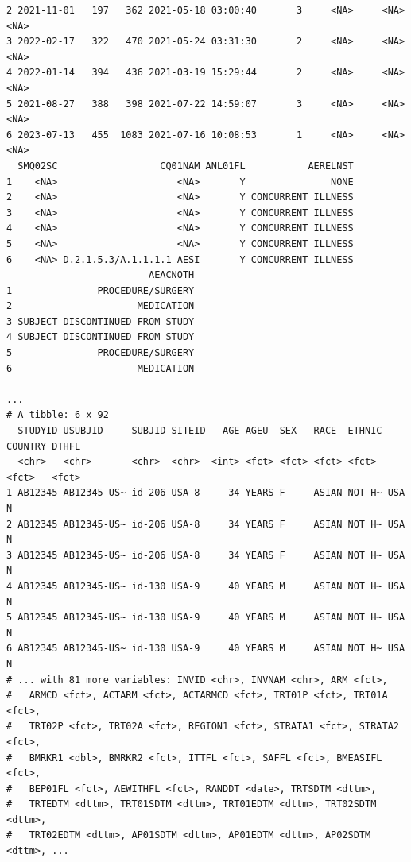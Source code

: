 \documentclass[
  letterpaper,
  DIV=11,
  numbers=noendperiod]{scrreprt}
\begin{document}
\begin{verbatim}
2 2021-11-01   197   362 2021-05-18 03:00:40       3     <NA>     <NA>    <NA>
3 2022-02-17   322   470 2021-05-24 03:31:30       2     <NA>     <NA>    <NA>
4 2022-01-14   394   436 2021-03-19 15:29:44       2     <NA>     <NA>    <NA>
5 2021-08-27   388   398 2021-07-22 14:59:07       3     <NA>     <NA>    <NA>
6 2023-07-13   455  1083 2021-07-16 10:08:53       1     <NA>     <NA>    <NA>
  SMQ02SC                  CQ01NAM ANL01FL           AERELNST
1    <NA>                     <NA>       Y               NONE
2    <NA>                     <NA>       Y CONCURRENT ILLNESS
3    <NA>                     <NA>       Y CONCURRENT ILLNESS
4    <NA>                     <NA>       Y CONCURRENT ILLNESS
5    <NA>                     <NA>       Y CONCURRENT ILLNESS
6    <NA> D.2.1.5.3/A.1.1.1.1 AESI       Y CONCURRENT ILLNESS
                         AEACNOTH
1               PROCEDURE/SURGERY
2                      MEDICATION
3 SUBJECT DISCONTINUED FROM STUDY
4 SUBJECT DISCONTINUED FROM STUDY
5               PROCEDURE/SURGERY
6                      MEDICATION

...
# A tibble: 6 x 92
  STUDYID USUBJID     SUBJID SITEID   AGE AGEU  SEX   RACE  ETHNIC COUNTRY DTHFL
  <chr>   <chr>       <chr>  <chr>  <int> <fct> <fct> <fct> <fct>  <fct>   <fct>
1 AB12345 AB12345-US~ id-206 USA-8     34 YEARS F     ASIAN NOT H~ USA     N    
2 AB12345 AB12345-US~ id-206 USA-8     34 YEARS F     ASIAN NOT H~ USA     N    
3 AB12345 AB12345-US~ id-206 USA-8     34 YEARS F     ASIAN NOT H~ USA     N    
4 AB12345 AB12345-US~ id-130 USA-9     40 YEARS M     ASIAN NOT H~ USA     N    
5 AB12345 AB12345-US~ id-130 USA-9     40 YEARS M     ASIAN NOT H~ USA     N    
6 AB12345 AB12345-US~ id-130 USA-9     40 YEARS M     ASIAN NOT H~ USA     N    
# ... with 81 more variables: INVID <chr>, INVNAM <chr>, ARM <fct>,
#   ARMCD <fct>, ACTARM <fct>, ACTARMCD <fct>, TRT01P <fct>, TRT01A <fct>,
#   TRT02P <fct>, TRT02A <fct>, REGION1 <fct>, STRATA1 <fct>, STRATA2 <fct>,
#   BMRKR1 <dbl>, BMRKR2 <fct>, ITTFL <fct>, SAFFL <fct>, BMEASIFL <fct>,
#   BEP01FL <fct>, AEWITHFL <fct>, RANDDT <date>, TRTSDTM <dttm>,
#   TRTEDTM <dttm>, TRT01SDTM <dttm>, TRT01EDTM <dttm>, TRT02SDTM <dttm>,
#   TRT02EDTM <dttm>, AP01SDTM <dttm>, AP01EDTM <dttm>, AP02SDTM <dttm>, ...
\end{verbatim}
\end{document}
